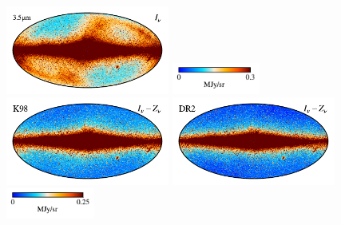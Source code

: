 \documentclass[twocolumn]{aa}
\begin{document}
\begin{figure}
    \includegraphics[height=2.90cm]{figs/compare_freq_maps/cosmoglobe_ma_03.pdf}%
    \includegraphics[width=2.90cm,angle=90]{figs/compare_freq_maps/cbar_tot_03.pdf}%
    \includegraphics[height=2.90cm]{figs/compare_freq_maps/dirbe_zsma_03.pdf}%
    \includegraphics[height=2.90cm]{figs/compare_freq_maps/cosmoglobe_zsma_03.pdf}%
    \includegraphics[width=2.90cm,angle=90]{figs/compare_freq_maps/cbar_03.pdf}%
      \\


\end{figure}
\end{document}
